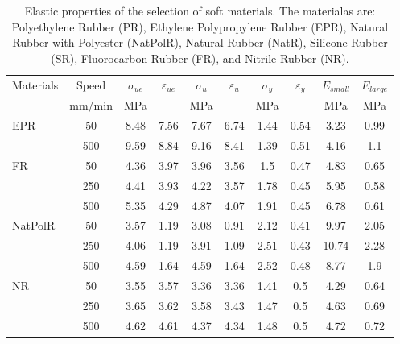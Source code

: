 \begin{table*}[htb!]
\centering
\caption{Elastic properties of the selection of soft materials. The materialas are: Polyethylene Rubber (PR), Ethylene Polypropylene Rubber (EPR), Natural Rubber with Polyester (NatPolR), Natural Rubber (NatR), Silicone Rubber (SR), Fluorocarbon Rubber (FR), and Nitrile Rubber (NR).}
\label{tbl:elasticProp}
\begin{tabular}{lccccccccc} \toprule
Materials                  & Speed & $\sigma_{ue}$ & $\varepsilon_{ue}$ & $\sigma_{u}$ & $\varepsilon_{u}$ & $\sigma_{y}$ & $\varepsilon_{y}$ & $E_{small}$ & $E_{large}$ \\
                           & mm/min   & MPa &  & MPa &  & MPa &  & MPa & MPa \\
\hline
\multirow{2}{*}{EPR}      & 50    & 8.48       & 7.56       & 7.67    & 6.74    & 1.44    & 0.54    & 3.23     & 0.99      \\
                           & 500   & 9.59       & 8.84       & 9.16    & 8.41    & 1.39    & 0.51    & 4.16     & 1.1       \\
\hline
\multirow{3}{*}{FR}      & 50    & 4.36       & 3.97       & 3.96    & 3.56    & 1.5     & 0.47    & 4.83     & 0.65      \\
                           & 250   & 4.41       & 3.93       & 4.22    & 3.57    & 1.78    & 0.45    & 5.95     & 0.58      \\
                           & 500   & 5.35       & 4.29       & 4.87    & 4.07    & 1.91    & 0.45    & 6.78     & 0.61      \\
\hline
\multirow{3}{*}{NatPolR}    & 50    & 3.57       & 1.19       & 3.08    & 0.91    & 2.12    & 0.41    & 9.97     & 2.05      \\
                           & 250   & 4.06       & 1.19       & 3.91    & 1.09    & 2.51    & 0.43    & 10.74    & 2.28      \\
                           & 500   & 4.59       & 1.64       & 4.59    & 1.64    & 2.52    & 0.48    & 8.77     & 1.9       \\
\hline
\multirow{3}{*}{NR}      & 50    & 3.55       & 3.57       & 3.36    & 3.36    & 1.41    & 0.5     & 4.29     & 0.64      \\
                           & 250   & 3.65       & 3.62       & 3.58    & 3.43    & 1.47    & 0.5     & 4.63     & 0.69      \\
                           & 500   & 4.62       & 4.61       & 4.37    & 4.34    & 1.48    & 0.5     & 4.72     & 0.72      \\

\end{tabular}
\end{table*}
